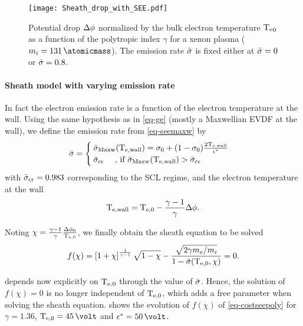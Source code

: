 \begin{figure}[!hbt]
  \centering
  \texttt{[image: Sheath\_drop\_with\_SEE.pdf]}
  \caption{Potential drop $\Delta \phi$ normalized by the bulk electron temperature $\mathrm{T_e}_0$ as a function of the polytropic index $\gamma$ for a xenon plasma ($m_i = 131\,\atomicmass$). The emission rate $ \bar{\sigma }$ is fixed either at $ \bar{\sigma }=0$ or $ \bar{\sigma }=0.8$.}
  \label{fig-dphi_see}
\end{figure}

\paragraph{Sheath model with varying emission rate\\}

In fact the electron emission rate is a function of the electron temperature at the wall.
Using the same hypothesis as in \cref{eq-ge} (mostly a Maxwellian \ac{EVDF} at the wall), we define the emission rate from \cref{eq-seemaxw} by
\begin{equation} \label{eq-seemaxw_poly}
   \bar{\sigma } = 
  \begin{cases}
     \bar{\sigma }_{\rm Maxw}(\mathrm{T_{e, wall}}) =  \sigma_0 + ( 1 - \sigma_0) \frac{ 2 \mathrm{T_{e, wall}}  }{\epsilon^{*}} \\
     \bar{\sigma }_{\rm cr} \text{ \quad, if }  \bar{\sigma }_{\rm Maxw}(\mathrm{T_{e, wall}}) >  \bar{\sigma }_{\rm cr}
  \end{cases}
\end{equation}
with $ \bar{\sigma }_{\rm cr} = 0.983$ corresponding to the \ac{SCL} regime, and the electron temperature at the wall
\begin{equation} \label{eq-Tewall}
  \mathrm{T_{e, wall}} = \mathrm{T_{e, 0}} - \frac{\gamma - 1}{\gamma } \Delta \phi.
\end{equation}


Noting $\chi = \frac{\gamma -1}{\gamma} \frac{ \Delta \phi_0}{ \mathrm{T_{e, 0}}} $, we finally obtain the sheath equation to be solved
\begin{equation} \label{eq-costseepoly}
  f(\chi) = \left[ 1 + \chi  \right]^{\frac{1}{\gamma - 1}} \sqrt{1 - \chi} - \frac{  \sqrt{2 \gamma m_e / m_i}}{1 -  \bar{\sigma } (\mathrm{T_{e, 0}}, \chi )} = 0.
\end{equation}

 depends now explicitly on $\mathrm{T_{e, 0}}$ through the value of $ \bar{\sigma }$.
Hence, the solution of $f(\chi)=0$ is no longer independent of $\mathrm{T_{e, 0}}$, which adds a free parameter when solving the sheath equation.
 shows the evolution of $f(\chi)$ of \cref{eq-costseepoly} for $\gamma = 1.36$, $\Teb=45\,\volt$ and $\crover=50\,\volt$.

